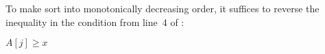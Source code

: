 To make  sort into monotonically decreasing order, it suffices to reverse the inequality in the condition from line~4 of :

\begin{codebox}
\setcounter{codelinenumber}{3}
\zi    \If $A[j]\ge x$
\end{codebox}
